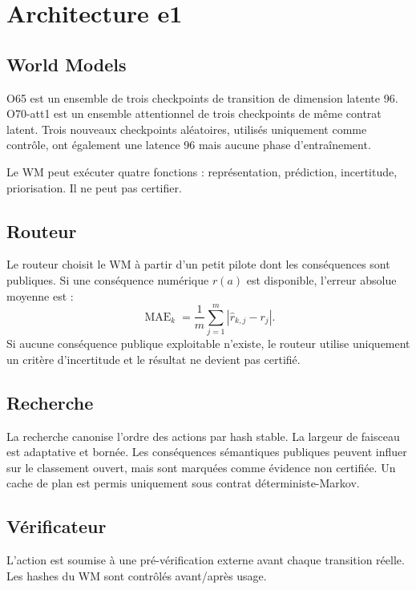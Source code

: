 \documentclass[11pt,a4paper]{article}
\begin{document}
\section{Architecture e1}
\subsection{World Models}
O65 est un ensemble de trois checkpoints de transition de dimension latente 96. O70-att1 est un ensemble attentionnel de trois checkpoints de même contrat latent. Trois nouveaux checkpoints aléatoires, utilisés uniquement comme contrôle, ont également une latence 96 mais aucune phase d'entraînement.

Le WM peut exécuter quatre fonctions : représentation, prédiction, incertitude, priorisation. Il ne peut pas certifier.
\subsection{Routeur}
Le routeur choisit le WM à partir d'un petit pilote dont les conséquences sont publiques. Si une conséquence numérique $r(a)$ est disponible, l'erreur absolue moyenne est :
\[
\operatorname{MAE}_k=\frac{1}{m}\sum_{j=1}^{m}|\hat r_{k,j}-r_j|.
\]
Si aucune conséquence publique exploitable n'existe, le routeur utilise uniquement un critère d'incertitude et le résultat ne devient pas certifié.
\subsection{Recherche}
La recherche canonise l'ordre des actions par hash stable. La largeur de faisceau est adaptative et bornée. Les conséquences sémantiques publiques peuvent influer sur le classement ouvert, mais sont marquées comme évidence non certifiée. Un cache de plan est permis uniquement sous contrat déterministe-Markov.
\subsection{Vérificateur}
L'action est soumise à une pré-vérification externe avant chaque transition réelle. Les hashes du WM sont contrôlés avant/après usage.
\end{document}
